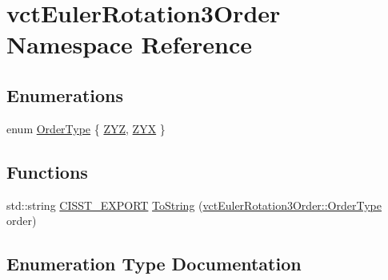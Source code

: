 \hypertarget{namespacevct_euler_rotation3_order}{}\section{vct\+Euler\+Rotation3\+Order Namespace Reference}
\label{namespacevct_euler_rotation3_order}
\subsection*{Enumerations}
\begin{DoxyCompactItemize}
\item 
enum \hyperlink{namespacevct_euler_rotation3_order_ac67e18ebf7cf8c53e5578514bff3efbb}{Order\+Type} \{ \hyperlink{namespacevct_euler_rotation3_order_ac67e18ebf7cf8c53e5578514bff3efbba6f3f3ac8f74e487e6a675b92e23f0740}{Z\+Y\+Z}, 
\hyperlink{namespacevct_euler_rotation3_order_ac67e18ebf7cf8c53e5578514bff3efbba2f5ff20db4a15ce6c11c9815870407f2}{Z\+Y\+X}
 \}
\end{DoxyCompactItemize}
\subsection*{Functions}
\begin{DoxyCompactItemize}
\item 
std\+::string \hyperlink{cmn_export_macros_8h_a99393e0c3ac434b2605235bbe20684f8}{C\+I\+S\+S\+T\+\_\+\+E\+X\+P\+O\+R\+T} \hyperlink{namespacevct_euler_rotation3_order_ac41dd520659446ebfdaf60abdea0a2de}{To\+String} (\hyperlink{namespacevct_euler_rotation3_order_ac67e18ebf7cf8c53e5578514bff3efbb}{vct\+Euler\+Rotation3\+Order\+::\+Order\+Type} order)
\end{DoxyCompactItemize}


\subsection{Enumeration Type Documentation}
\hypertarget{namespacevct_euler_rotation3_order_ac67e18ebf7cf8c53e5578514bff3efbb}{}
